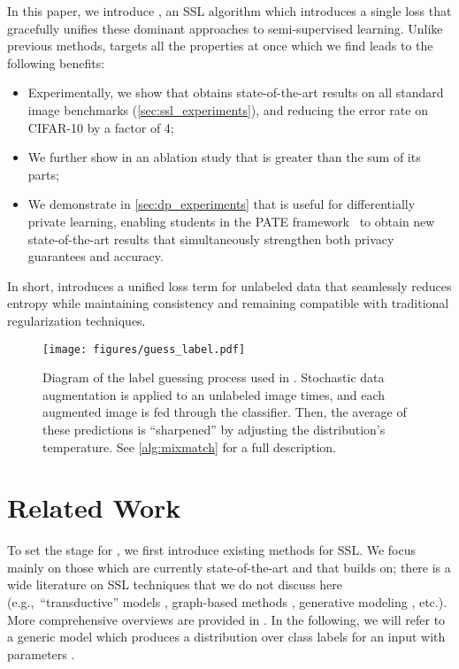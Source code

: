 \documentclass{article}
\begin{document}
In this paper, we introduce , an SSL algorithm which introduces a single loss that gracefully unifies these dominant approaches to semi-supervised learning.
Unlike previous methods,  targets all the properties at once which we find leads to the following benefits:

\begin{itemize}
    \item Experimentally, we show that  obtains state-of-the-art results on all standard image benchmarks (\cref{sec:ssl_experiments}), and reducing the error rate on CIFAR-10 by a factor of 4;
    \item We further show in an ablation study that  is greater than the sum of its parts;
    \item We demonstrate in \cref{sec:dp_experiments} that  is useful for differentially private learning, enabling students in the PATE framework~\cite{papernot2016semi} to obtain new state-of-the-art results that simultaneously strengthen both privacy guarantees and accuracy.
\end{itemize}

In short,  introduces a unified loss term for unlabeled data that seamlessly reduces entropy while maintaining consistency and remaining compatible with traditional regularization techniques.

\begin{figure}
    \centering
    \texttt{[image: figures/guess\_label.pdf]}
    \caption{Diagram of the label guessing process used in . Stochastic data augmentation is applied to an unlabeled image  times, and each augmented image is fed through the classifier. Then, the average of these  predictions is ``sharpened'' by adjusting the distribution's temperature. See \cref{alg:mixmatch} for a full description.}
    \label{fig:guess_label}
\end{figure}

\section{Related Work}
\label{sec:related_work}

To set the stage for , we first introduce existing methods for SSL.
We focus mainly on those which are currently state-of-the-art and that  builds on; there is a wide literature on SSL techniques that we do not discuss here (e.g.,\ ``transductive'' models \cite{gammerman1998learning,joachims2003transductive,joachims1999transductive}, graph-based methods \cite{zhu2003semi,bengio2006label,liu2018deep}, generative modeling \cite{Belkin+Niyogi-2002,LasserreJ2006,Russ+Geoff-nips-2007,Coates2011b,Goodfellow2011,kingma2014semi,pu2016variational,odena2016semi,salimans2016improved}, etc.).
More comprehensive overviews are provided in \cite{zhu2003semi,chapelle2006semi}.
In the following, we will refer to a generic model  which produces a distribution over class labels  for an input  with parameters .
\end{document}
